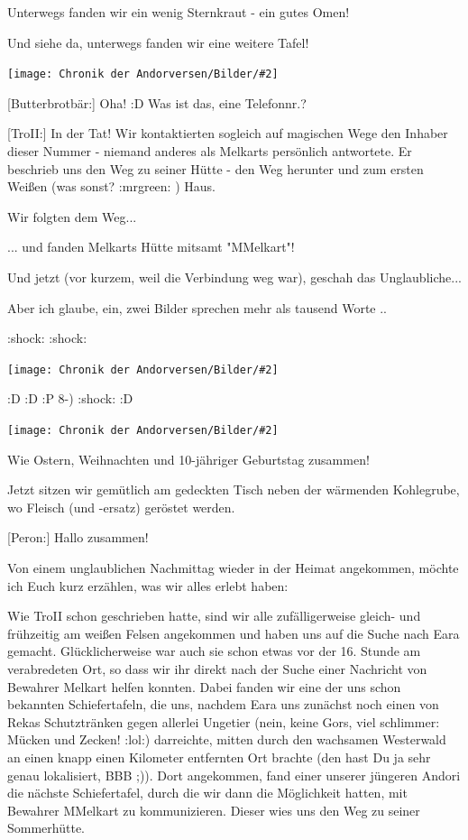 \documentclass[10pt, a4paper, oneside]{book}
\newcommand{\bildmitts}[2][height=0.32\textwidth,width=0.48\textwidth,keepaspectratio]{%
    \begin{center}
        \texttt{[image: Chronik der Andorversen/Bilder/\#2]}
    \end{center}
}
\begin{document}
\begin{multicols}{2}
Unterwegs fanden wir ein wenig Sternkraut - ein gutes Omen!

Und siehe da, unterwegs fanden wir eine weitere Tafel!

\bildmitts{AA2022 Tafel Thorn.jpeg}

[Butterbrotbär:] Oha! :D
Was ist das, eine Telefonnr.?

[TroII:] In der Tat! Wir kontaktierten sogleich auf magischen Wege den Inhaber dieser Nummer - niemand anderes als Melkarts persönlich antwortete. Er beschrieb uns den Weg zu seiner Hütte - den Weg herunter und zum ersten Weißen (was sonst? :mrgreen: ) Haus.

Wir folgten dem Weg...

... und fanden Melkarts Hütte mitsamt "MMelkart"!

Und jetzt (vor kurzem, weil die Verbindung weg war), geschah das Unglaubliche...

Aber ich glaube, ein, zwei Bilder sprechen mehr als tausend Worte ..

:shock: :shock: 

\bildmitts{AA2022 Finale 1.jpeg}

:D :D :P 8-) :shock: :D

\bildmitts{AA2022 Finale 2.jpeg}

Wie Ostern, Weihnachten und 10-jähriger Geburtstag zusammen!

Jetzt sitzen wir gemütlich am gedeckten Tisch neben der wärmenden Kohlegrube, wo Fleisch (und -ersatz) geröstet werden.

[Peron:] Hallo zusammen!

Von einem unglaublichen Nachmittag wieder in der Heimat angekommen, möchte ich Euch kurz erzählen, was wir alles erlebt haben:

Wie TroII schon geschrieben hatte, sind wir alle zufälligerweise gleich- und frühzeitig am weißen Felsen angekommen und haben uns auf die Suche nach Eara gemacht. Glücklicherweise war auch sie schon etwas vor der 16. Stunde am verabredeten Ort, so dass wir ihr direkt nach der Suche einer Nachricht von Bewahrer Melkart helfen konnten. Dabei fanden wir eine der uns schon bekannten Schiefertafeln, die uns, nachdem Eara uns zunächst noch einen von Rekas Schutztränken gegen allerlei Ungetier (nein, keine Gors, viel schlimmer: Mücken und Zecken! :lol:) darreichte, mitten durch den wachsamen Westerwald an einen knapp einen Kilometer entfernten Ort brachte (den hast Du ja sehr genau lokalisiert, BBB ;)). Dort angekommen, fand einer unserer jüngeren Andori die nächste Schiefertafel, durch die wir dann die Möglichkeit hatten, mit Bewahrer MMelkart zu kommunizieren. Dieser wies uns den Weg zu seiner Sommerhütte.


\end{multicols}
\end{document}
